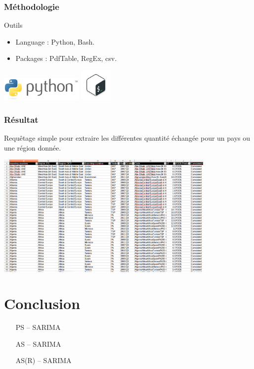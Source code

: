 \documentclass[handout]{beamer}
\begin{document}
\begin{frame}
  \frametitle{Méthodologie}

  \begin{block}{Outils}
  	\begin{itemize}
    		\item Language : Python, Bash.
    		\item Packages : PdfTable, RegEx, csv.
  	\end{itemize}
  		\includegraphics[width=4cm]{python}
  		\hspace{2cm}
		\includegraphics[width=1.6cm]{Bash}
		
  \end{block}
 \end{frame}
 
 \begin{frame}
  \frametitle{Résultat}

    Requêtage simple pour extraire les différentes quantité échangée pour un pays ou une région donnée.\vspace{1mm}
	\begin{center}
	\includegraphics[width=0.8\textwidth, height=0.7\textheight, keepaspectratio]{IFAcsv}
	\end{center}
  
 \end{frame}

\section{Conclusion}


\begin{frame}

  \begin{itemize}
    \item [PS] – SARIMA
    \item [AS] – SARIMA
    \item [AS(R)] – SARIMA
  \end{itemize}
\end{frame}
\end{document}
